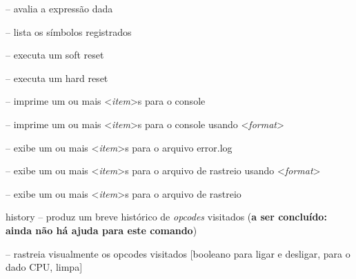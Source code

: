 \documentclass[letterpaper,10pt,brazil]{sphinxmanual}
\begin{document}
\begin{DUlineblock}{0em}
\item[] {\hyperref[debugger/general:debugger\string-command\string-do]{}} -- avalia a expressão dada
\item[] {\hyperref[debugger/general:debugger\string-command\string-symlist]{}} -- lista os símbolos registrados
\item[] {\hyperref[debugger/general:debugger\string-command\string-softreset]{}} -- executa um soft reset
\item[] {\hyperref[debugger/general:debugger\string-command\string-hardreset]{}} -- executa um hard reset
\item[] {\hyperref[debugger/general:debugger\string-command\string-print]{}} -- imprime um ou mais \textless{}\emph{item}\textgreater{}s para o console
\item[] {\hyperref[debugger/general:debugger\string-command\string-printf]{}} -- imprime um ou mais \textless{}\emph{item}\textgreater{}s para o console usando \textless{}\emph{format}\textgreater{}
\item[] {\hyperref[debugger/general:debugger\string-command\string-logerror]{}} -- exibe um ou mais \textless{}\emph{item}\textgreater{}s para o arquivo error.log
\item[] {\hyperref[debugger/general:debugger\string-command\string-tracelog]{}} -- exibe um ou mais \textless{}\emph{item}\textgreater{}s para o arquivo de rastreio usando \textless{}\emph{format}\textgreater{}
\item[] {\hyperref[debugger/general:debugger\string-command\string-tracesym]{}} -- exibe um ou mais \textless{}\emph{item}\textgreater{}s para o arquivo de rastreio
\item[] history -- produz um breve histórico de \emph{opcodes} visitados (\textbf{a ser concluído: ainda não há ajuda para este comando})
\item[] {\hyperref[debugger/general:debugger\string-command\string-trackpc]{}} -- rastreia visualmente os opcodes visitados {[}booleano para ligar e desligar, para o dado CPU, limpa{]}

\end{DUlineblock}
\end{document}
